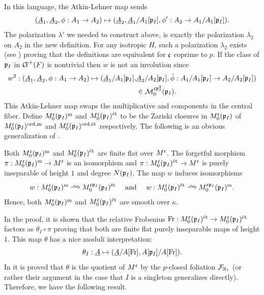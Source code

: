 \documentclass[main.tex]{subfiles}
\begin{document}
{In this language, the Atkin-Lehner map sends 
\[ (\underline{A}_1, \underline{A}_2, \phi : A_1 \to A_2) \mapsto (\underline{A}_2, \underline{A}_1/A_1[\mathfrak{p}_I], \phi' : A_2 \to A_1/A_1[\mathfrak{p}_I]). \]
The polarization $\lambda'$ we needed to construct above, is exactly the polarization $\lambda_2$ on $A_2$ in the new definition. For any isotropic $H$, such a polarization $\lambda_2$ exists (see \cite[p.14]{goren_deshalit:foliations_shimura}) proving that the definitions are equivalent for $\mathfrak{c}$ coprime to $p$. If the class of $\mathfrak{p}_I$ in $\operatorname{\mathcal{C}\!{\ell}}^+(F)$ is nontrivial then $w$ is not an involution since
\begin{align*}
 w^2 : (\underline{A}_1, \underline{A}_2, \phi : A_1 \to A_2) \mapsto (\underline{A}_1/A_1[\mathfrak{p}_I], & \underline{A}_2/A_2[\mathfrak{p}_I], \bar{\phi} : A_1/A_1[\mathfrak{p}_I] \to A_2/A_2[\mathfrak{p}_I]) 
\\
& \in \mathcal{M}^{\mathfrak{c} \mathfrak{p}_I^2}_0(\mathfrak{p}_I).
\end{align*}
This Atkin-Lehner map swaps the multiplicative and \etale components in the central fiber. 
Define $M_0^{\mathfrak{c}}(\mathfrak{p}_I)^{\text{m}}$ and $M_0^{\mathfrak{c}}(\mathfrak{p}_I)^{\mathrm{\acute{e}t}}$ to be the Zariski closures in $M_0^{\mathfrak{c}}(\mathfrak{p}_I)$ of $M_0^{\mathfrak{c}}(\mathfrak{p}_I)^{\operatorname{\mathrm{ord}}, \text{m}}$ and $M_0^{\mathfrak{c}}(\mathfrak{p}_I)^{\operatorname{\mathrm{ord}}, \mathrm{\acute{e}t}}$ respectively. The following is an obvious generalization of \cite[Proposition~3.3.3]{goren_deshalit:foliations_shimura}.

\begin{prop}
Both $M_0^{\mathfrak{c}}(\mathfrak{p}_I)^{\text{m}}$ and $M_0^{\mathfrak{c}}(\mathfrak{p}_I)^{\mathrm{\acute{e}t}}$ are finite flat over $M^{\mathfrak{c}}$. The forgetful morphism $\pi : M_0^{\mathfrak{c}}(\mathfrak{p}_I)^{\text{m}} \to M^{\mathfrak{c}}$ is an isomorphism and $\pi : M_0^{\mathfrak{c}}(\mathfrak{p}_I)^{\mathrm{\acute{e}t}} \to M^{\mathfrak{c}}$ is purely inseparable of height $1$ and degree $N(\mathfrak{p}_I)$. The map $w$ induces isomorphisms
\[ w : M_0^{\cc}(\p_I)^{\text{m}} \iso M_0^{\cc \p_I}(\p_I)^{\et} \quad \text{ and } \quad w : M_0^{\cc}(\p_I)^{\et} \iso M_0^{\cc \p_I}(\p_I)^{\text{m}}. \]
Hence, both $M_0^{\mathfrak{c}}(\mathfrak{p}_I)^{\text{m}}$ and $M_0^{\mathfrak{c}}(\mathfrak{p}_I)^{\mathrm{\acute{e}t}}$ are smooth over $\kappa$.
\end{prop}

In the proof, it is shown that the relative Frobenius $\operatorname{\mathrm{Fr}} : M_0^{\mathfrak{c}}(\mathfrak{p}_I)^{\mathrm{\acute{e}t}} \to M_0^{\mathfrak{c}}(\mathfrak{p}_I)^{\mathrm{\acute{e}t}}$ factors as $\theta_I \circ \pi$ proving that both are finite flat purely inseparable maps of height $1$. This map $\theta$ has a nice moduli interpretation:
\[ \theta_I : \underline{A} \mapsto (\underline{A} / A[\operatorname{\mathrm{Fr}}], A[\mathfrak{p}_I] / A[\operatorname{\mathrm{Fr}}]). \]
In \cite[3.4.2]{goren_deshalit:foliations_shimura} it is proved that $\theta$ is the quotient of $M^{\mathfrak{c}}$ by the $p$-closed foliation $\mathcal{F}_{\mathbb{B}_I}$ (or rather their argument in the case that $I$ is a singleton generalizes directly). Therefore, we have the following result.

}
\end{document}
